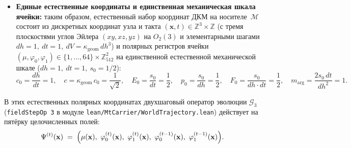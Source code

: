 \begin{itemize}[leftmargin=*,noitemsep]
\item \textbf{Единые естественные координаты и единственная механическая шкала ячейки:}
  таким образом, естественный набор координат ДКМ на носителе~$\mathcal{M}$ состоит из дискретных координат узла и такта $(\mathbf{x}, t) \in \mathbb{Z}^3 \times \mathbb{Z}$ (с тремя плоскостями углов Эйлера $(xy, xz, yz)$ на $O_2(3)$ и элементарными шагами $dh = 1,\ dt = 1,\ dV = \kappa_{\mathrm{geom}}\,dh^3$) и полярных регистров ячейки $(\mu, \varphi_0, \varphi_1) \in \{1,\dots,64\}\times\mathbb{Z}_{512}^2$ на единственной естественной механической шкале ($dh = 1,\ dt = 1,\ s_0 = 1/2$):
  \begin{equation}
    \label{eq:mono-natural-scale-ladder}
    c_0 = \frac{dh}{dt} = 1, \quad
    c = \kappa_{\mathrm{geom}}\,c_0 = \frac{1}{\sqrt{2}}, \quad
    E_0 = \frac{s_0}{dt} = \frac{1}{2}, \quad
    p_0 = \frac{s_0}{dh} = \frac{1}{2}, \quad
    F_0 = \frac{s_0}{dh\cdot dt} = \frac{1}{2}, \quad
    m_{\mathrm{arg}} = \frac{2 s_0\,dt}{dh^2} = 1.
  \end{equation}
\end{itemize}
В этих естественных полярных координатах двухшаговый оператор эволюции $\mathcal{G}_3$ (\texttt{fieldStepOp 3} в модуле \texttt{lean/\allowbreak MtCarrier/\allowbreak WorldTrajectory.lean}) действует на пятёрку целочисленных полей:
\begin{equation}
  \label{eq:mono-field-state-tuple}
  \Psi^{(t)}(\mathbf{x}) \;=\; \Bigl(\mu(\mathbf{x}),\ \varphi_0^{(t)}(\mathbf{x}),\ \varphi_1^{(t)}(\mathbf{x}),\ \varphi_0^{(t-1)}(\mathbf{x}),\ \varphi_1^{(t-1)}(\mathbf{x})\Bigr).
\end{equation}
